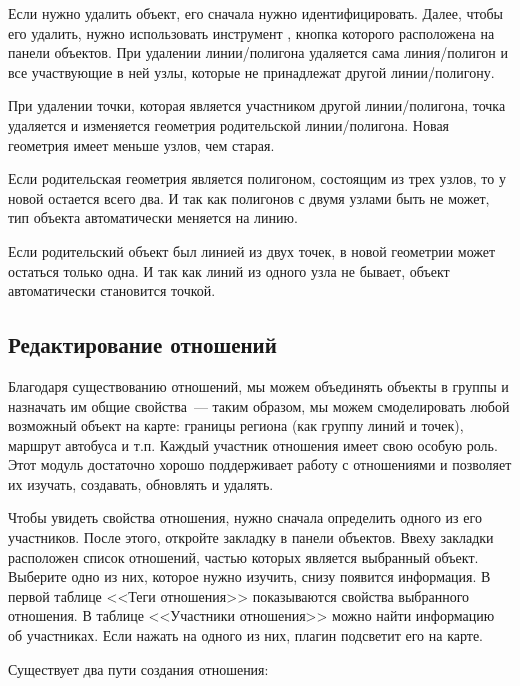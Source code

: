 
Если нужно удалить объект, его сначала нужно идентифицировать. Далее,
чтобы его удалить, нужно использовать инструмент
, кнопка которого
расположена на панели объектов. При удалении линии/полигона удаляется
сама линия/полигон и все участвующие в ней узлы, которые не принадлежат
другой линии/полигону.

При удалении точки, которая является участником другой линии/полигона,
точка удаляется и изменяется геометрия родительской линии/полигона.
Новая геометрия имеет меньше узлов, чем старая.

Если родительская геометрия является полигоном, состоящим из трех узлов,
то у новой остается всего два. И так как полигонов с двумя узлами быть
не может, тип объекта автоматически меняется на линию.

Если родительский объект был линией из двух точек, в новой геометрии
может остаться только одна. И так как линий из одного узла не бывает,
объект автоматически становится точкой.

\subsection{Редактирование отношений}\label{editing_osm_relation}

Благодаря существованию отношений, мы можем объединять объекты в группы
и назначать им общие свойства~--- таким образом, мы можем смоделировать
любой возможный объект на карте: границы региона (как группу линий и
точек), маршрут автобуса и т.п. Каждый участник отношения имеет свою
особую роль. Этот модуль достаточно хорошо поддерживает работу с
отношениями и позволяет их изучать, создавать, обновлять и удалять.

\label{examrelation}

Чтобы увидеть свойства отношения, нужно сначала определить одного из его
участников. После этого, откройте закладку  в панели
объектов. Ввеху закладки расположен список отношений, частью которых
является выбранный объект. Выберите одно из них, которое нужно изучить,
снизу появится информация. В первой таблице <<Теги отношения>>
показываются свойства выбранного отношения. В таблице <<Участники
отношения>> можно найти информацию об участниках. Если нажать на одного
из них, плагин подсветит его на карте.


Существует два пути создания отношения:

